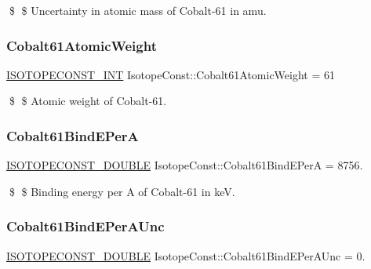 \$ \$ Uncertainty in atomic mass of Cobalt-\/61 in amu. \mbox{\label{group___isotope_const-_cobalt-_co61_gab6aa47a6d3186bc68914e1343ccdcbd3}} 
\subsubsection{\texorpdfstring{Cobalt61\+Atomic\+Weight}{Cobalt61AtomicWeight}}
{\footnotesize\ttfamily \mbox{\hyperlink{group___isotope_const-_macros_ga5f18360b3e99483a35c32d789e62621c}{I\+S\+O\+T\+O\+P\+E\+C\+O\+N\+S\+T\+\_\+\+I\+NT}} Isotope\+Const\+::\+Cobalt61\+Atomic\+Weight = 61}

\$ \$ Atomic weight of Cobalt-\/61. \mbox{\label{group___isotope_const-_cobalt-_co61_ga3e3b5e2727b54dd3560ad03d673a5c10}} 
\subsubsection{\texorpdfstring{Cobalt61\+Bind\+E\+PerA}{Cobalt61BindEPerA}}
{\footnotesize\ttfamily \mbox{\hyperlink{group___isotope_const-_macros_ga8f45a7272ce02c0b4c65c44636ed719a}{I\+S\+O\+T\+O\+P\+E\+C\+O\+N\+S\+T\+\_\+\+D\+O\+U\+B\+LE}} Isotope\+Const\+::\+Cobalt61\+Bind\+E\+PerA = 8756.}

\$ \$ Binding energy per A of Cobalt-\/61 in keV. \mbox{\label{group___isotope_const-_cobalt-_co61_gadf5b085a6c9dcc03bc1efaf4da841a7e}} 
\subsubsection{\texorpdfstring{Cobalt61\+Bind\+E\+Per\+A\+Unc}{Cobalt61BindEPerAUnc}}
{\footnotesize\ttfamily \mbox{\hyperlink{group___isotope_const-_macros_ga8f45a7272ce02c0b4c65c44636ed719a}{I\+S\+O\+T\+O\+P\+E\+C\+O\+N\+S\+T\+\_\+\+D\+O\+U\+B\+LE}} Isotope\+Const\+::\+Cobalt61\+Bind\+E\+Per\+A\+Unc = 0.}

